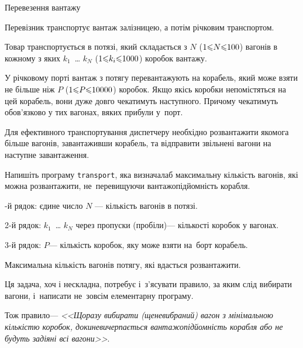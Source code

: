 \documentclass[14pt,a4paper]{extarticle}
\begin{document}
\begin{problemAllDefault}{Перевезення вантажу}

Перевізник транспортує вантаж залізницею, а потім річковим транспортом.

Товар транспортується в потязі, який складається з $N$ ($1{\leqslant}N{\leqslant}100$) вагонів в кожному з яких $k_1$~\dots{} $k_N$ ($1{\leqslant}k_i{\leqslant}1000$) коробок вантажу.

У річковому порті вантаж з потягу перевантажують на корабель, який може взяти не більше ніж $P$ ($1{\leqslant}P{\leqslant}10000$) коробок. Якщо якісь коробки не\nolinebreak[3] помістяться на цей корабель, вони дуже довго чекатимуть наступного. Причому чекатимуть обов'язково у тих вагонах, в\nolinebreak[3] яких прибули у~порт.

Для ефективного транспортування диспетчеру необхідно розвантажити якомога більше вагонів, завантаживши корабель, та відправити звільнені вагони на наступне завантаження.

\Task	Напишіть програму \texttt{transport}, яка визначала\nolinebreak[3] б максимальну кількість вагонів, які можна розвантажити, не~перевищуючи вантажопідйомність корабля.

-й рядок: єдине число $N$ --- кількість вагонів в потязі.

2-й рядок: $k_1$~\dots{} $k_N$ через пропуски (пробіли)\nolinebreak[3] --- кількості коробок у вагонах.

3-й рядок: $P$\nolinebreak[3] --- кількість коробок, яку може взяти на~борт корабель.


\OutputFile Максимальна кількість вагонів потягу, які вдасться розвантажити.


\Example
\begin{exampleSimple}{5em}{3em}%
%
\end{exampleSimple}

\end{problemAllDefault}
	

\Tutorial	Ця задача, хоч і нескладна, потребує і~з'ясувати правило, за яким слід вибирати вагони, і~написати не~зовсім елементарну програму. 

Тож правило\nolinebreak[3] --- \textsl{<<Щоразу вибирати (ще\nolinebreak[3] не\nolinebreak[3] вибраний) вагон з мінімальною кількістю коробок, доки\nolinebreak[3] не\nolinebreak[3] вичерпається вантажопідйомність корабля або не будуть задіяні всі вагони>>}.
\end{document}
